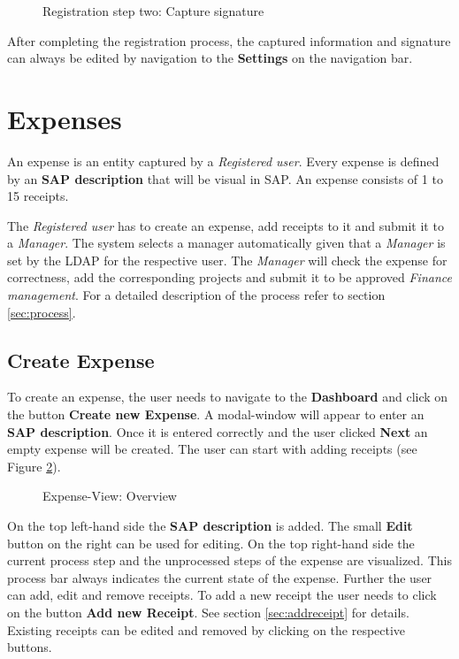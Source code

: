 \begin{figure}[H]
    \centering
    \caption{Registration step two: Capture signature}
    \label{fig:registration-step02}
\end{figure}

After completing the registration process, the captured information and signature can always be edited by navigation to the \textbf{Settings} on the navigation bar.

\section{Expenses}

An expense is an entity captured by a \textit{Registered user}. Every expense is defined by an \textbf{SAP description} that will be visual in SAP. An expense consists of 1 to 15 receipts.

The \textit{Registered user} has to create an expense, add receipts to it and submit it to a \textit{Manager}. The system selects a manager automatically given that a \textit{Manager} is set by the LDAP for the respective user. The \textit{Manager} will check the expense for correctness, add the corresponding projects and submit it to be approved \textit{Finance management}. For a detailed description of the process refer to section \ref{sec:process}.

\subsection{Create Expense}

To create an expense, the user needs to navigate to the \textbf{Dashboard} and click on the button \textbf{Create new Expense}. A modal-window will appear to enter an \textbf{SAP description}. Once it is entered correctly and the user clicked \textbf{Next} an empty expense will be created. The user can start with adding receipts (see Figure \ref{fig:expensesitems-overview}).

\begin{figure}[H]
    \centering
    \caption{Expense-View: Overview}
    \label{fig:expensesitems-overview}
\end{figure}

On the top left-hand side the \textbf{SAP description} is added. The small \textbf{Edit} button on the right can be used for editing. On the top right-hand side the current process step and the unprocessed steps of the expense are visualized. This process bar always indicates the current state of the expense.\newline
Further the user can add, edit and remove receipts. To add a new receipt the user needs to click on the button \textbf{Add new Receipt}. See section \ref{sec:addreceipt} for details. \newline
Existing receipts can be edited and removed by clicking on the respective buttons.


